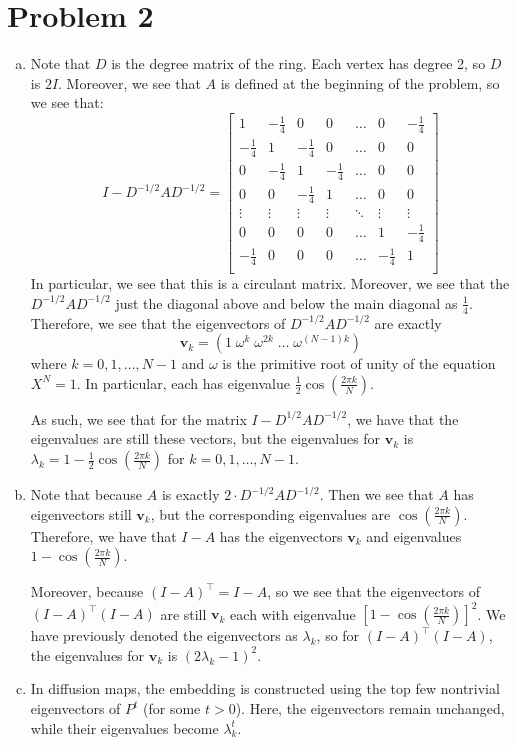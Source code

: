 \documentclass[11pt]{scrartcl}
\begin{document}
\newpage

\section{Problem 2}

\begin{enumerate}[(a)]
    \item Note that $D$ is the degree matrix of the ring. Each vertex has degree 2, so $D$ is $2I$. Moreover, we see that $A$ is defined at the beginning of the problem, so we see that:
    \[I - D^{-1/2}AD^{-1/2} = \left[\begin{array}{cccccccc}
        1 & -\frac 14 & 0 & 0 & \dots & 0 & -\frac 14 \\
        -\frac 14 & 1 & -\frac 14 & 0 & \dots & 0 & 0 \\
        0 & -\frac 14 & 1 & -\frac 14 & \dots & 0 & 0 \\
        0 & 0 & -\frac 14 & 1 & \dots & 0 & 0 \\
        \vdots & \vdots & \vdots & \vdots & \ddots & \vdots &\vdots \\
        0 & 0 & 0 & 0 &\dots & 1 & -\frac 14 \\
        -\frac 14 & 0 & 0 & 0 &\dots & -\frac 14 & 1 \\
    \end{array}\right]\]
    In particular, we see that this is a circulant matrix. Moreover, we see that the $D^{-1/2}AD^{-1/2}$ just the diagonal above and below the main diagonal as $\frac 14$. Therefore, we see that the eigenvectors of $D^{-1/2}AD^{-1/2}$ are exactly \[\mathbf v_k = (1 \; \omega^k \; \omega^{2k} \; \dots \; \omega^{(N-1)k})\]
    where $k = 0, 1, \dots, N-1$ and $\omega$ is the primitive root of unity of the equation $X^N=1$. In particular, each has eigenvalue $\frac{1}{2}\cos\left(\frac{2\pi k}{N}\right)$.

    As such, we see that for the matrix $I-D^{1/2}AD^{-1/2}$, we have that the eigenvalues are still these vectors, but the eigenvalues for $\mathbf v_k$ is $\lambda_k = 1-\frac 12\cos(\frac{2\pi k}{N})$ for $k=0, 1, \dots, N-1$.
    \item Note that because $A$ is exactly $2 \cdot D^{-1/2}AD^{-1/2}$. Then we see that $A$ has eigenvectors still $\mathbf v_k$, but the corresponding eigenvalues are $\cos\left(\frac{2\pi k}{N}\right)$. Therefore, we have that $I-A$ has the eigenvectors $\mathbf v_k$ and eigenvalues $1-\cos\left(\frac{2\pi k}{N}\right)$.
    
    Moreover, because $(I-A)^\top = I-A$, so we see that the eigenvectors of $(I-A)^\top(I-A)$ are still $\mathbf v_k$ each with eigenvalue $\left[1-\cos\left(\frac{2\pi k}{N}\right)\right]^2$. We have previously denoted the eigenvectors as $\lambda_k$, so for $(I-A)^\top(I-A)$, the eigenvalues for $\mathbf v_k$ is $(2\lambda_k - 1)^2$.
    \item In diffusion maps, the embedding is constructed using the top few nontrivial eigenvectors of \( P^t \) (for some \( t>0 \)). Here, the eigenvectors remain unchanged, while their eigenvalues become \( \lambda_k^t \). 


\end{enumerate}
\end{document}
